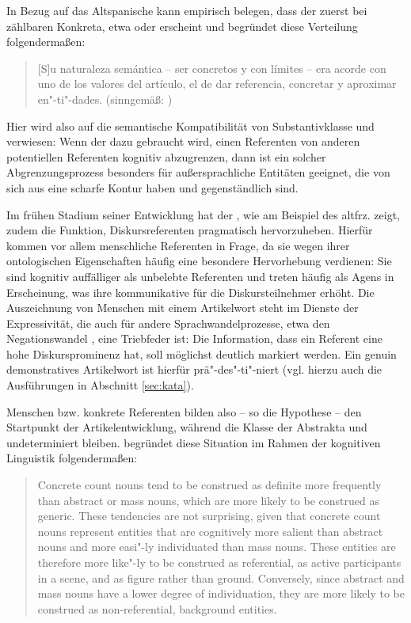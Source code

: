 In Bezug auf das Altspanische kann \textcite[421]{Company1991} empirisch belegen, dass der  zuerst bei zählbaren  Konkreta, etwa  oder  erscheint und begründet diese Verteilung folgendermaßen: \blockcquote[421]{Company1991}{[S]u naturaleza semántica -- ser  concretos y con límites -- era acorde
con uno de los valores del artículo, el de dar referencia, concretar y aproximar
en"-ti"-dades. (sinngemäß: )} Hier wird also auf die semantische Kompatibilität von Substantivklasse  und  verwiesen:  Wenn der  dazu gebraucht wird, einen Referenten von anderen potentiellen Referenten kognitiv abzugrenzen, dann ist ein solcher Abgrenzungsprozess besonders für außersprachliche Entitäten geeignet, die von sich aus eine scharfe Kontur haben und gegenständlich sind.

Im frühen Stadium seiner Entwicklung hat der , wie \textcite{Epstein1993,Epstein1994} am Beispiel des altfrz.  zeigt, zudem die Funktion, Diskursreferenten pragmatisch hervorzuheben. Hierfür kommen vor allem menschliche Referenten in Frage, da sie wegen ihrer ontologischen Eigenschaften häufig eine besondere Hervorhebung verdienen: Sie sind kognitiv auffälliger als unbelebte  Referenten und treten häufig als Agens  in Erscheinung, was ihre kommunikative  für die Diskursteilnehmer erhöht. Die Auszeichnung von Menschen mit einem Artikelwort steht im Dienste der Expressivität, die auch für andere Sprachwandelprozesse, etwa den Negationswandel \parencite{Jager2008}, eine Triebfeder ist: Die Information, dass ein Referent eine hohe Diskursprominenz hat, soll möglichst deutlich markiert werden. Ein genuin demonstratives Artikelwort  ist hierfür prä"-des"-ti"-niert (vgl. hierzu auch die Ausführungen in Abschnitt \ref{sec:kata}).

Menschen bzw. konkrete  Referenten bilden also -- so die Hypothese -- den Startpunkt der Artikelentwicklung, während die Klasse der Abstrakta  und  undeterminiert bleiben. \textcite{Epstein1994} begründet diese Situation im Rahmen der kognitiven Linguistik folgendermaßen: \blockcquote[71]{Epstein1994}{Concrete count nouns tend to be construed as definite more frequently than
abstract or mass nouns, which are more likely to be construed as generic.
These tendencies are not surprising, given that concrete count nouns represent
entities that are cognitively more salient than abstract nouns and more
easi"-ly individuated than mass nouns. These entities are therefore more
like"-ly to be construed as referential, as active participants in a scene, and as figure rather than ground. Conversely, since abstract and mass nouns have
a lower degree of individuation, they are more likely to be construed as
non-referential, background entities.} 

